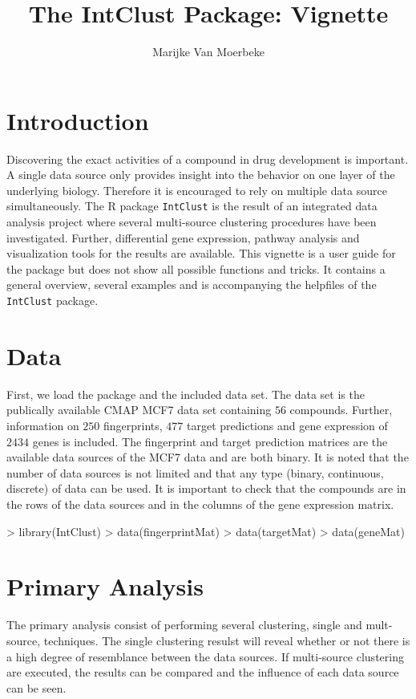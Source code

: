\documentclass[a4paper]{article}
\title{The IntClust Package: Vignette}
\author{Marijke Van Moerbeke}
\begin{document}
\maketitle
\tableofcontents
\pagebreak{}


\section{Introduction}
Discovering the exact activities of a compound in drug development is important.
A single data source only provides insight into the behavior on one layer of the
underlying biology. Therefore it is encouraged to rely on multiple data source
simultaneously. The R package \texttt{IntClust} is the result of an integrated
data analysis project where several multi-source clustering procedures have been
investigated. Further, differential gene expression, pathway analysis and
visualization tools for the results are available. This vignette is a user guide
for the package but does not show all possible functions and tricks. It
contains a general overview, several examples and is accompanying the
helpfiles of the \texttt{IntClust} package.
\section{Data}
First, we load the package and the included data set. The data set is the
publically available CMAP MCF7 data set containing $56$ compounds. Further,
information on $250$ fingerprints, $477$ target predictions and gene
expression of $2434$ genes is included. The fingerprint and target prediction
matrices are the available data sources of the MCF7 data and are both binary. It
is noted that the number of data sources is not limited and that any type
(binary, continuous, discrete) of data can be used. It is important to check
that the compounds are in the rows of the data sources and in the columns of
the gene expression matrix.

\begin{Schunk}
\begin{Sinput}
> library(IntClust)
> data(fingerprintMat)
> data(targetMat)
> data(geneMat)
\end{Sinput}
\end{Schunk}
\section{Primary Analysis}
The primary analysis consist of performing several clustering, single and
mult-source, techniques. The single clustering resulst will reveal whether or
not there is a high degree of resemblance between the data sources. If
multi-source clustering are executed, the results can be compared and the
influence of each data source can be seen. 
\end{document}
